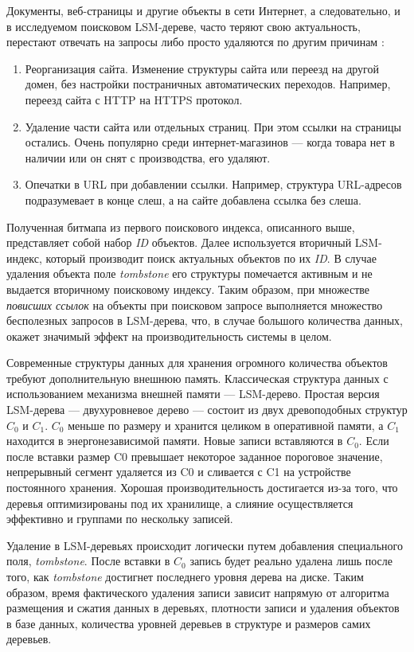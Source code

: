 Документы, веб-страницы и другие объекты в сети Интернет, а следовательно, и в
исследуемом поисковом LSM-дереве, часто теряют свою актуальность, перестают
отвечать на запросы либо просто удаляются по другим причинам \cite{Dangling:2018}:
\begin{enumerate}
    \item Реорганизация сайта. Изменение структуры сайта или переезд на другой домен,
    без настройки постраничных автоматических переходов. Например, переезд сайта с 
    HTTP на HTTPS протокол.
    \item Удаление части сайта или отдельных страниц. При этом ссылки на страницы
    остались. Очень популярно среди интернет-магазинов — когда товара нет в наличии
    или он снят с производства, его удаляют.
    \item Опечатки в URL при добавлении ссылки. Например, структура URL-адресов
    подразумевает в конце слеш, а на сайте добавлена ссылка без слеша.
\end{enumerate}

Полученная битмапа из первого поискового индекса, описанного выше, представляет
собой набор \textit{ID} объектов.
Далее используется вторичный LSM-индекс, который производит поиск актуальных 
объектов по их \textit{ID}. В случае удаления объекта поле \textit{tombstone} его
структуры помечается активным и не выдается вторичному поисковому индексу.
Таким образом, при множестве \textit{повисших ссылок} на объекты при поисковом запросе
выполняется множество бесполезных запросов в LSM-дерева, что, в случае большого
количества данных, окажет значимый эффект на производительность системы в целом.

Современные структуры данных для хранения огромного количества объектов требуют
дополнительную внешнюю память. Классическая структура данных с использованием механизма
внешней памяти — LSM-дерево. Простая версия LSM-дерева — двухуровневое дерево — состоит
из двух древоподобных структур $C_0$ и $C_1$. $C_0$ меньше по размеру и хранится
целиком в оперативной памяти, а $C_1$ находится в энергонезависимой памяти. Новые
записи вставляются в $C_0$. Если после вставки размер C0 превышает некоторое заданное
пороговое значение, непрерывный сегмент удаляется из C0 и сливается с C1 на устройстве
постоянного хранения. Хорошая производительность достигается из-за того, что деревья
оптимизированы под их хранилище, а слияние осуществляется эффективно и группами по
нескольку записей.

Удаление в LSM-деревьях происходит логически путем добавления специального поля,
\textit{tombstone}. После вставки в $C_0$ запись будет реально удалена лишь после
того, как \textit{tombstone} достигнет последнего уровня дерева на диске. Таким
образом, время фактического удаления записи зависит напрямую от алгоритма размещения
и сжатия данных в деревьях, плотности записи и удаления объектов в базе данных, количества уровней деревьев в структуре и размеров самих деревьев. 

